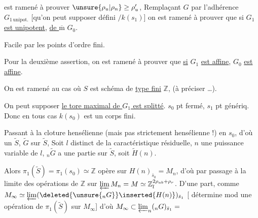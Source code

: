 est ramené à prouver $\unsure{\rho_u|\rho_n}\geq\rho'_u$,  Remplaçant $G$ par l'adhérence  $G_{1\,\mathrm{unipot}.}$ [qu'on peut supposer défini $/k(s_1)$] on est ramené  à prouver que si \uline{$G_1$ est unipotent}, \uline{de $\overline{\mathrm m}$} $G_0$.

Facile par les points d'ordre fini.

Pour la deuxième assertion, on est ramené à prouver que \uline{si} $G_1$ \uline{est affine}, $G_0$ \uline{est affine}.

On est ramené au cas  où $S$ est  schéma  de \uline{type fini}   $\mathbb Z$,  (à préciser \ldots).

 On peut supposer  \uline{le tore maximal de $G_1$ est splitté}. $s_0$ pt fermé, $s_1$ pt génériq. Donc en tous cas $k(s_0)$ est un corps fini.


Passant à la cloture hensélienne (mais pas strictement hensélienne !) en $s_0$, d'où un $\widetilde S$, $\widetilde G$ sur $\widetilde S$,  Soit $l$ distinct de la caractéristique résiduelle, $n$ une puissance variable de $l$, $ {}_n\widetilde G$ a une partie  sur $\widetilde S$, soit $\widetilde H(n)$.

Alors $\pi_1(\widetilde S)=\pi_1(s_0)\simeq\mathbb Z$ opère sur $H(n)_{\bar s_0}=M_n$, d'où par passage à la limite des opérations de $\mathbb Z$ sur $\varprojlim M_n=M\simeq\mathbb Z_l^{2\rho_{ab}+\rho_r}$. D'une part,  comme $M_\infty\simeq\varprojlim(\deleted{\unsure{{}_nG}}\inserted{H(n)})_{\bar s_1}$  [ détermine mod une opération de $\pi_1(\widetilde S)$ sur $M_\infty$] d'où $M_\infty\subset\varprojlim_n({}_nG)_{\bar s_1}=$ 
